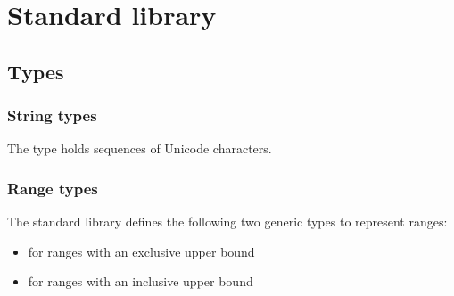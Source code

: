 
\chapter{Standard library}

\section{Types}

\subsection{String types}

The type  holds sequences of Unicode characters.

\subsection{Range types}

The standard library defines the following two generic types to represent
ranges:

\begin{itemize}
\item {} for ranges with an exclusive upper bound
\item {} for ranges with an inclusive upper bound
\end{itemize}
